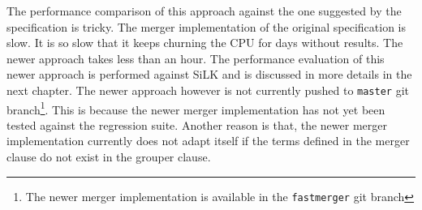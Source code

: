 The performance comparison of this approach against the one suggested by the
specification is tricky. The merger implementation of the original
specification is slow. It is so slow that it keeps churning the CPU for days
without results. The newer approach takes less than an hour. The performance
evaluation of this newer approach is performed against SiLK and is discussed
in more details in  the
next chapter. The newer approach however is not currently pushed to
\texttt{master} git branch\footnote{The newer merger implementation is
available in the \texttt{fastmerger} git branch}. This is because the newer
merger implementation has not yet been tested against the regression suite.
Another reason is that, the newer merger implementation currently does not
adapt itself if the terms defined in the merger clause do not exist in the
grouper clause.





